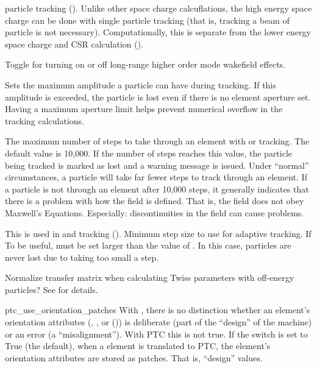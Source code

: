{\begin{description}
particle tracking (). Unlike other space charge calcuflations, the high
energy space charge can be done with single particle tracking (that is, tracking a beam of particle
is not necessary). Computationally, this is separate from the lower energy space charge and CSR
calculation ().
%
\item[\vn{lr_wakes_on}] \Newline
Toggle for turning on or off long-range higher order mode wakefield effects.
%
\item[\vn{max_aperture_limit}] \Newline 
Sets the maximum amplitude a particle can have during tracking. If this amplitude is exceeded, the
particle is lost even if there is no element aperture set. Having a maximum aperture limit helps
prevent numerical overflow in the tracking calculations.
%
\item[\vn{max_num_runge_kutta_step}] \Newline 
The maximum number of steps to take through an element with  or
 tracking. The default value is 10,000. If the number of steps reaches this
value, the particle being tracked is marked as lost and a warning message is issued. Under
``normal'' circumstances, a particle will take far fewer steps to track through an element. If a
particle is not through an element after 10,000 steps, it generally indicates that there is a
problem with how the field is defined. That is, the field does not obey Maxwell's
Equations. Especially: discontinuities in the field can cause problems.
%
\item[\vn{min_ds_adaptive_tracking}] \Newline
This is used in  and  tracking (). Minimum step
size to use for adaptive tracking. If To be useful,  must be set
larger than the value of . In this case, particles are never lost
due to taking too small a step.
%
\item[\vn{normalize_twiss}] \Newline
Normalize transfer matrix when calculating Twiss parameters with off-energy particles?
See  for details.
%
\item{ptc_use_orientation_patches} \Newline
With \bmad, there is no distinction whether an element's orientation attributes (,
, or  ()) is deliberate (part of the ``design'' of the machine)
or an error (a ``misalignment'').  With PTC this is not true. If the 
switch is set to True (the default), when a \bmad element is translated to PTC,
the element's orientation attributes are stored as patches. That is, ``design'' values.

\end{description}}
